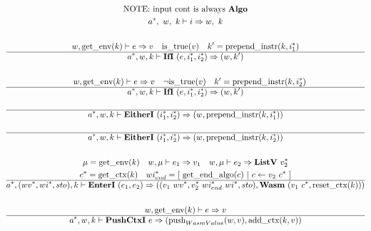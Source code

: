 
\begin{gather*}
  \text{NOTE: input cont is always \algo} \\
  \seq{a}, ~ w, ~ k \vdash i \Rightarrow w, ~ k \\
%
\newline \\
  w, \getenv(k) \vdash e \Rightarrow v \quad
  \istrue(v) \quad k' = \prependinstr(k, \seq{i_1}) \\
  \hline
  \seq{a}, w, k \vdash \ifi ~ (e, \seq{i_1}, \seq{i_2}) \Rightarrow (w, k') \\
%
\newline \\
  \quad w, \getenv(k) \vdash e \Rightarrow v \quad
  \neg \istrue(v) \quad k' = \prependinstr(k, \seq{i_2}) \\
  \hline
  \seq{a}, w, k \vdash \ifi ~ (e, \seq{i_1}, \seq{i_2}) \Rightarrow (w, k') \\
%
\newline \\
  \hline
  \seq{a}, w, k \vdash \eitheri ~ (\seq{i_1}, \seq{i_2}) \Rightarrow (w, \prependinstr(k, \seq{i_1})) \\
%
\newline \\
  \hline
  \seq{a}, w, k \vdash \eitheri ~ (\seq{i_1}, \seq{i_2}) \Rightarrow (w, \prependinstr(k, \seq{i_2})) \\
%
\newline \\
  \mu = \getenv(k) \quad
  w, \mu \vdash e_1 \Rightarrow v_1 \quad
  w, \mu \vdash e_2 \Rightarrow \listv ~ \seq{v_2} \\
  \seq c = \getctx(k) \quad
  \seq{wi_{end}} = [ ~ \getendalgo(c) ~ | ~ c \leftarrow v_2 ~ \seq c ~ ] \\
  \hline
  \seq{a}, (\seq{wv}, \seq{wi}, sto), k \vdash \enteri ~ (e_1, e_2)
  \Rightarrow
  ((v_1 ~ \seq{wv}, \seq{v_2} ~ \seq{wi_{end}}~ \seq{wi}, sto), \wasm ~ (v_1 ~ \seq c, \resetctx(k))) \\
%
\newline \\
  w, \getenv(k) \vdash e \Rightarrow v \\
  \hline
  \seq{a}, w, k \vdash \pushctxi ~ e
  \Rightarrow
  (\push_{WasmValue}(w, v), \addctx(k, v)) \\
%
\newline \\

\end{gather*}
